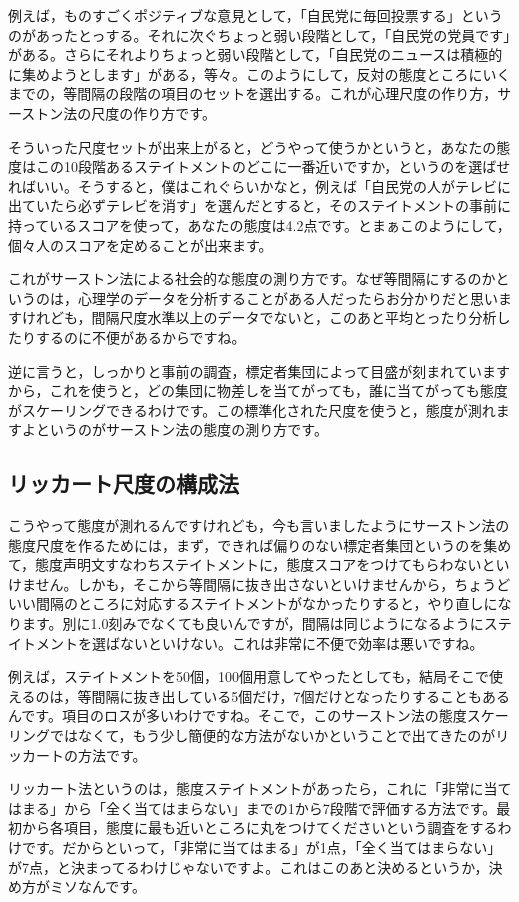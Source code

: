 \documentclass{ltjsbook}
\begin{document}
例えば，ものすごくポジティブな意見として，「自民党に毎回投票する」というのがあったとっする。それに次ぐちょっと弱い段階として，「自民党の党員です」がある。さらにそれよりちょっと弱い段階として，「自民党のニュースは積極的に集めようとします」がある，等々。このようにして，反対の態度ところにいくまでの，等間隔の段階の項目のセットを選出する。これが心理尺度の作り方，サーストン法の尺度の作り方です。

そういった尺度セットが出来上がると，どうやって使うかというと，あなたの態度はこの10段階あるステイトメントのどこに一番近いですか，というのを選ばせればいい。そうすると，僕はこれぐらいかなと，例えば「自民党の人がテレビに出ていたら必ずテレビを消す」を選んだとすると，そのステイトメントの事前に持っているスコアを使って，あなたの態度は4.2点です。とまぁこのようにして，個々人のスコアを定めることが出来ます。

これがサーストン法による社会的な態度の測り方です。なぜ等間隔にするのかというのは，心理学のデータを分析することがある人だったらお分かりだと思いますけれども，間隔尺度水準以上のデータでないと，このあと平均とったり分析したりするのに不便があるからですね。

逆に言うと，しっかりと事前の調査，標定者集団によって目盛が刻まれていますから，これを使うと，どの集団に物差しを当てがっても，誰に当てがっても態度がスケーリングできるわけです。この標準化された尺度を使うと，態度が測れますよというのがサーストン法の態度の測り方です。

\subsection{リッカート尺度の構成法}
こうやって態度が測れるんですけれども，今も言いましたようにサーストン法の態度尺度を作るためには，まず，できれば偏りのない標定者集団というのを集めて，態度声明文すなわちステイトメントに，態度スコアをつけてもらわないといけません。しかも，そこから等間隔に抜き出さないといけませんから，ちょうどいい間隔のところに対応するステイトメントがなかったりすると，やり直しになります。別に1.0刻みでなくても良いんですが，間隔は同じようになるようにステイトメントを選ばないといけない。これは非常に不便で効率は悪いですね。

例えば，ステイトメントを50個，100個用意してやったとしても，結局そこで使えるのは，等間隔に抜き出している5個だけ，7個だけとなったりすることもあるんです。項目のロスが多いわけですね。そこで，このサーストン法の態度スケーリングではなくて，もう少し簡便的な方法がないかということで出てきたのがリッカートの方法です。

リッカート法というのは，態度ステイトメントがあったら，これに「非常に当てはまる」から「全く当てはまらない」までの1から7段階で評価する方法です。最初から各項目，態度に最も近いところに丸をつけてくださいという調査をするわけです。だからといって，「非常に当てはまる」が1点，「全く当てはまらない」が7点，と決まってるわけじゃないですよ。これはこのあと決めるというか，決め方がミソなんです。
\end{document}
